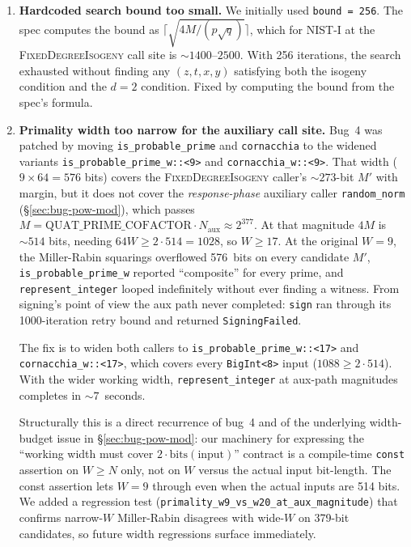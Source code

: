 \begin{enumerate}
  \item \textbf{Hardcoded search bound too small.}
    We initially used \texttt{bound = 256}.  The spec computes the
    bound as $\lceil\sqrt{4M / (p\sqrt{q})}\rceil$, which for
    NIST-I at the \textsc{FixedDegreeIsogeny} call site is
    ${\sim}1400$--$2500$.  With 256 iterations, the search exhausted
    without finding any $(z, t, x, y)$ satisfying both the isogeny
    condition and the $d = 2$ condition.  Fixed by computing the bound
    from the spec's formula.

  \item \textbf{Primality width too narrow for the auxiliary call
    site.}  Bug~4 was patched by moving
    \texttt{is\_probable\_prime} and \texttt{cornacchia} to the
    widened variants \texttt{is\_probable\_prime\_w::<9>} and
    \texttt{cornacchia\_w::<9>}.  That width ($9 \times 64 = 576$
    bits) covers the \textsc{FixedDegreeIsogeny} caller's
    ${\sim}273$-bit $M'$ with margin, but it does not cover the
    \emph{response-phase} auxiliary caller \texttt{random\_norm}
    (§\ref{sec:bug-pow-mod}), which passes
    $M = \mathrm{QUAT\_PRIME\_COFACTOR} \cdot N_{\mathrm{aux}}
    \approx 2^{377}$.  At that magnitude $4M$ is ${\sim}514$ bits,
    needing $64W \geq 2 \cdot 514 = 1028$, so $W \geq 17$.  At the
    original $W = 9$, the Miller-Rabin squarings overflowed
    576~bits on every candidate $M'$, \texttt{is\_probable\_prime\_w}
    reported ``composite'' for every prime, and
    \texttt{represent\_integer} looped indefinitely without ever
    finding a witness.  From signing's point of view the aux path
    never completed: \texttt{sign} ran through its 1000-iteration
    retry bound and returned \texttt{SigningFailed}.

    The fix is to widen both callers to
    \texttt{is\_probable\_prime\_w::<17>} and
    \texttt{cornacchia\_w::<17>}, which covers every
    \texttt{BigInt<8>} input ($1088 \geq 2 \cdot 514$).  With the
    wider working width, \texttt{represent\_integer} at aux-path
    magnitudes completes in ${\sim}7$~seconds.

    Structurally this is a direct recurrence of bug~4 and of the
    underlying width-budget issue in §\ref{sec:bug-pow-mod}: our
    machinery for expressing the ``working width must cover
    $2 \cdot \mathrm{bits}(\text{input})$'' contract is a
    compile-time \texttt{const} assertion on $W \geq N$ only, not
    on $W$ versus the actual input bit-length.  The const
    assertion lets $W = 9$ through even when the actual inputs are
    514 bits.  We added a regression test
    (\texttt{primality\_w9\_vs\_w20\_at\_aux\_magnitude}) that
    confirms narrow-$W$ Miller-Rabin disagrees with wide-$W$ on
    379-bit candidates, so future width regressions surface
    immediately.
\end{enumerate}

